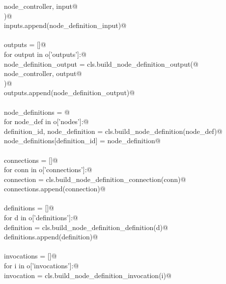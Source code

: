\documentclass[
    a4paper,      %
    10pt,         %
    openright,    %
    notitlepage,  %
    parskip=half, %
]{scrreprt}       %
\theoremstyle{definition}                    %
\begin{document}
\begin{flushleft}
\begin{minipage}{\linewidth}
\begin{list}{}{}
\mbox{}\lstinline@            node_controller, input@\\
\mbox{}\lstinline@        )@\\
\mbox{}\lstinline@        inputs.append(node_definition_input)@\\
\mbox{}\lstinline@@\\
\mbox{}\lstinline@    outputs = []@\\
\mbox{}\lstinline@    for output in o['outputs']:@\\
\mbox{}\lstinline@        node_definition_output = cls.build_node_definition_output(@\\
\mbox{}\lstinline@            node_controller, output@\\
\mbox{}\lstinline@        )@\\
\mbox{}\lstinline@        outputs.append(node_definition_output)@\\
\mbox{}\lstinline@@\\
\mbox{}\lstinline@    node_definitions = {}@\\
\mbox{}\lstinline@    for node_def in o['nodes']:@\\
\mbox{}\lstinline@        definition_id, node_definition = cls.build_node_definition(node_def)@\\
\mbox{}\lstinline@        node_definitions[definition_id] = node_definition@\\
\mbox{}\lstinline@@\\
\mbox{}\lstinline@    connections = []@\\
\mbox{}\lstinline@    for conn in o['connections']:@\\
\mbox{}\lstinline@        connection = cls.build_node_definition_connection(conn)@\\
\mbox{}\lstinline@        connections.append(connection)@\\
\mbox{}\lstinline@@\\
\mbox{}\lstinline@    definitions = []@\\
\mbox{}\lstinline@    for d in o['definitions']:@\\
\mbox{}\lstinline@        definition = cls.build_node_definition_definition(d)@\\
\mbox{}\lstinline@        definitions.append(definition)@\\
\mbox{}\lstinline@@\\
\mbox{}\lstinline@    invocations = []@\\
\mbox{}\lstinline@    for i in o['invocations']:@\\
\mbox{}\lstinline@        invocation = cls.build_node_definition_invocation(i)@\\

\end{list}
\end{minipage}
\end{flushleft}
\end{document}
